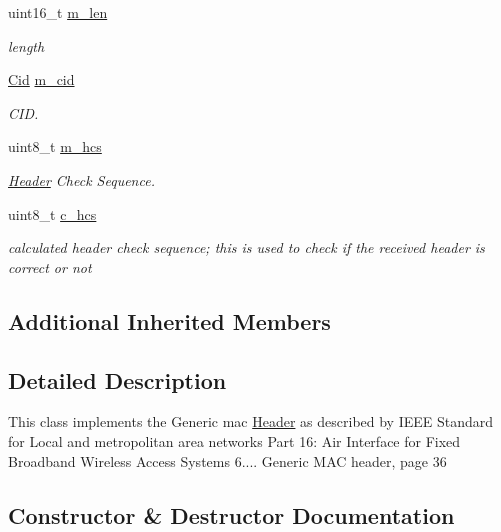 \begin{DoxyCompactItemize}
uint16\+\_\+t \hyperlink{classns3_1_1GenericMacHeader_a654e7aa3e36a5d055e72ffee0907ce46}{m\+\_\+len}
\begin{DoxyCompactList}\small\item\em length \end{DoxyCompactList}\item 
\hyperlink{classns3_1_1Cid}{Cid} \hyperlink{classns3_1_1GenericMacHeader_aaef3e7fcc428b7efb07fff44159f5606}{m\+\_\+cid}
\begin{DoxyCompactList}\small\item\em C\+ID. \end{DoxyCompactList}\item 
uint8\+\_\+t \hyperlink{classns3_1_1GenericMacHeader_a1fd241718b50431acfdba2310dff52d1}{m\+\_\+hcs}
\begin{DoxyCompactList}\small\item\em \hyperlink{classns3_1_1Header}{Header} Check Sequence. \end{DoxyCompactList}\item 
uint8\+\_\+t \hyperlink{classns3_1_1GenericMacHeader_aeef38ec340d4a5d1a28a52aca4c3341b}{c\+\_\+hcs}
\begin{DoxyCompactList}\small\item\em calculated header check sequence; this is used to check if the received header is correct or not \end{DoxyCompactList}\end{DoxyCompactItemize}
\subsection*{Additional Inherited Members}


\subsection{Detailed Description}
This class implements the Generic mac \hyperlink{classns3_1_1Header}{Header} as described by I\+E\+EE Standard for Local and metropolitan area networks Part 16\+: Air Interface for Fixed Broadband Wireless Access Systems 6.... Generic M\+AC header, page 36 

\subsection{Constructor \& Destructor Documentation}
